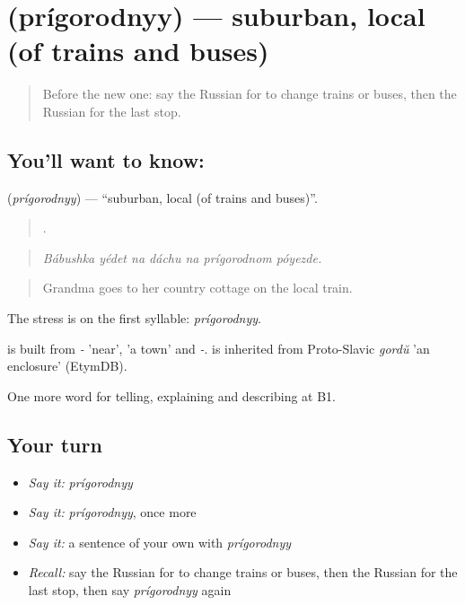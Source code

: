 \section[\texorpdfstring{\ru{пригородный} (prígorodnyy)}{пригородный (prígorodnyy)}]{ (prígorodnyy) — suburban, local (of trains and buses)}

\label{lesson:RU-C418-prigorodnyy}



\begin{quote}
Before the new one: say the Russian for to change trains or buses, then the Russian for the last stop.
\end{quote}

\subsection*{You'll want to know: }
\textbf{} (\emph{prígorodnyy}) — \textquotedblleft{}suburban, local (of trains and buses)\textquotedblright{}.

\begin{quote}
      .
\end{quote}

\begin{quote}
\emph{Bábushka yédet na dáchu na prígorodnom póyezde.}
\end{quote}

\begin{quote}
Grandma goes to her country cottage on the local train.
\end{quote}

The stress is on the first syllable: \emph{prígorodnyy}.

\begin{cousinweb}
\emph{} is built from \emph{-} 'near', \emph{} 'a town' and \emph{-}. \emph{} is inherited from Proto-Slavic \emph{gordŭ} 'an enclosure' (EtymDB).
\end{cousinweb}

\begin{grammarlens}[title={What you've built}]
One more word for telling, explaining and describing at B1.
\end{grammarlens}

\subsection*{Your turn}
\begin{itemize}
\raggedright
  \item \emph{Say it:} \emph{prígorodnyy}
  \item \emph{Say it:} \emph{prígorodnyy}, once more
  \item \emph{Say it:} a sentence of your own with \emph{prígorodnyy}
  \item \emph{Recall:} say the Russian for to change trains or buses, then the Russian for the last stop, then say \emph{prígorodnyy} again
\end{itemize}

